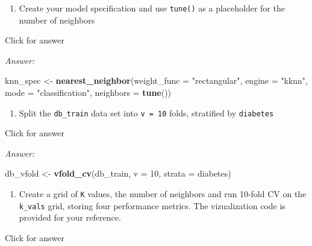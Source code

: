 \documentclass[
]{book}
\newenvironment{Shaded}{\begin{snugshade}}{\end{snugshade}}
\newcommand{\AttributeTok}[1]{\textcolor[rgb]{0.13,0.29,0.53}{#1}}
\newcommand{\DecValTok}[1]{\textcolor[rgb]{0.00,0.00,0.81}{#1}}
\newcommand{\FunctionTok}[1]{\textcolor[rgb]{0.13,0.29,0.53}{\textbf{#1}}}
\newcommand{\NormalTok}[1]{#1}
\newcommand{\OtherTok}[1]{\textcolor[rgb]{0.56,0.35,0.01}{#1}}
\newcommand{\StringTok}[1]{\textcolor[rgb]{0.31,0.60,0.02}{#1}}
\providecommand{\tightlist}{%
  \setlength{\itemsep}{0pt}\setlength{\parskip}{0pt}}
\begin{document}
\begin{enumerate}
\def\labelenumi{\alph{enumi}.}
\setcounter{enumi}{1}
\tightlist
\item
  Create your model specification and use \texttt{tune()} as a placeholder for the number of neighbors
\end{enumerate}

Click for answer

\emph{Answer:}

\begin{Shaded}
\begin{Highlighting}[]
\NormalTok{knn\_spec }\OtherTok{\textless{}{-}} \FunctionTok{nearest\_neighbor}\NormalTok{(}\AttributeTok{weight\_func =} \StringTok{"rectangular"}\NormalTok{, }
                             \AttributeTok{engine =} \StringTok{"kknn"}\NormalTok{,}
                             \AttributeTok{mode =} \StringTok{"classification"}\NormalTok{,}
                             \AttributeTok{neighbors =} \FunctionTok{tune}\NormalTok{())}
\end{Highlighting}
\end{Shaded}

\begin{enumerate}
\def\labelenumi{\alph{enumi}.}
\setcounter{enumi}{2}
\tightlist
\item
  Split the \texttt{db\_train} data set into \texttt{v\ =\ 10} folds, stratified by \texttt{diabetes}
\end{enumerate}

Click for answer

\emph{Answer:}

\begin{Shaded}
\begin{Highlighting}[]
\NormalTok{db\_vfold }\OtherTok{\textless{}{-}} \FunctionTok{vfold\_cv}\NormalTok{(db\_train, }\AttributeTok{v =} \DecValTok{10}\NormalTok{, }\AttributeTok{strata =}\NormalTok{ diabetes)}
\end{Highlighting}
\end{Shaded}

\begin{enumerate}
\def\labelenumi{\alph{enumi}.}
\setcounter{enumi}{3}
\tightlist
\item
  Create a grid of \texttt{K} values, the number of neighbors and run 10-fold CV on the \texttt{k\_vals} grid, storing four performance metrics. The vizualization code is provided for your reference.
\end{enumerate}

Click for answer
\end{document}
